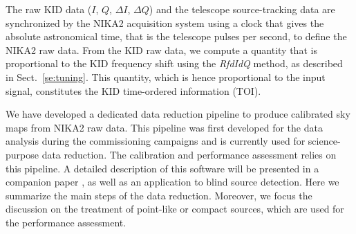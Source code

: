

The raw KID data ($I$, $Q$, $\Delta I$, $\Delta Q$) and the telescope
source-tracking data are synchronized by the NIKA2 acquisition system using a
clock that gives the absolute astronomical time, that is the telescope
pulses per second, to define the NIKA2 raw data. From the KID raw
data, we compute a quantity that is proportional to the KID
frequency shift using the \emph{RfdIdQ} method, as described in
Sect.~\ref{se:tuning}. This quantity, which is hence proportional to
the input signal, constitutes the KID time-ordered information (TOI).


We have developed a dedicated data reduction pipeline to
produce calibrated sky maps from NIKA2 raw data. This pipeline was first 
developed for the data analysis during the commissioning campaigns and
is currently used for science-purpose data reduction. The calibration
and performance assessment relies on this pipeline. 
A detailed description of this software will be presented in a companion
paper \citep{Ponthieu2019}, as well as an application to blind source
detection. Here we summarize the main steps of the data
reduction. {\lp Moreover, we focus the discussion on the treatment of
point-like or compact sources, which are used for the
performance assessment.}

